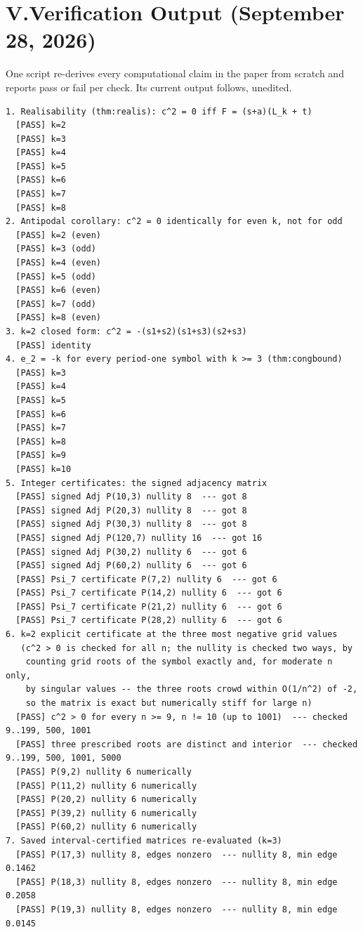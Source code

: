 \documentclass[11pt]{article}
\begin{document}
\section*{V.\quad Verification Output \hfill\normalsize\normalfont(September 28, 2026)}
One script re-derives every computational claim in the paper from scratch and
reports pass or fail per check. Its current output follows, unedited.
\begingroup\footnotesize\begin{verbatim}
1. Realisability (thm:realis): c^2 = 0 iff F = (s+a)(L_k + t)
  [PASS] k=2
  [PASS] k=3
  [PASS] k=4
  [PASS] k=5
  [PASS] k=6
  [PASS] k=7
  [PASS] k=8
2. Antipodal corollary: c^2 = 0 identically for even k, not for odd
  [PASS] k=2 (even)
  [PASS] k=3 (odd)
  [PASS] k=4 (even)
  [PASS] k=5 (odd)
  [PASS] k=6 (even)
  [PASS] k=7 (odd)
  [PASS] k=8 (even)
3. k=2 closed form: c^2 = -(s1+s2)(s1+s3)(s2+s3)
  [PASS] identity
4. e_2 = -k for every period-one symbol with k >= 3 (thm:congbound)
  [PASS] k=3
  [PASS] k=4
  [PASS] k=5
  [PASS] k=6
  [PASS] k=7
  [PASS] k=8
  [PASS] k=9
  [PASS] k=10
5. Integer certificates: the signed adjacency matrix
  [PASS] signed Adj P(10,3) nullity 8  --- got 8
  [PASS] signed Adj P(20,3) nullity 8  --- got 8
  [PASS] signed Adj P(30,3) nullity 8  --- got 8
  [PASS] signed Adj P(120,7) nullity 16  --- got 16
  [PASS] signed Adj P(30,2) nullity 6  --- got 6
  [PASS] signed Adj P(60,2) nullity 6  --- got 6
  [PASS] Psi_7 certificate P(7,2) nullity 6  --- got 6
  [PASS] Psi_7 certificate P(14,2) nullity 6  --- got 6
  [PASS] Psi_7 certificate P(21,2) nullity 6  --- got 6
  [PASS] Psi_7 certificate P(28,2) nullity 6  --- got 6
6. k=2 explicit certificate at the three most negative grid values
   (c^2 > 0 is checked for all n; the nullity is checked two ways, by
    counting grid roots of the symbol exactly and, for moderate n only,
    by singular values -- the three roots crowd within O(1/n^2) of -2,
    so the matrix is exact but numerically stiff for large n)
  [PASS] c^2 > 0 for every n >= 9, n != 10 (up to 1001)  --- checked 9..199, 500, 1001
  [PASS] three prescribed roots are distinct and interior  --- checked 9..199, 500, 1001, 5000
  [PASS] P(9,2) nullity 6 numerically
  [PASS] P(11,2) nullity 6 numerically
  [PASS] P(20,2) nullity 6 numerically
  [PASS] P(39,2) nullity 6 numerically
  [PASS] P(60,2) nullity 6 numerically
7. Saved interval-certified matrices re-evaluated (k=3)
  [PASS] P(17,3) nullity 8, edges nonzero  --- nullity 8, min edge 0.1462
  [PASS] P(18,3) nullity 8, edges nonzero  --- nullity 8, min edge 0.2058
  [PASS] P(19,3) nullity 8, edges nonzero  --- nullity 8, min edge 0.0145

\end{verbatim}
\end{document}
